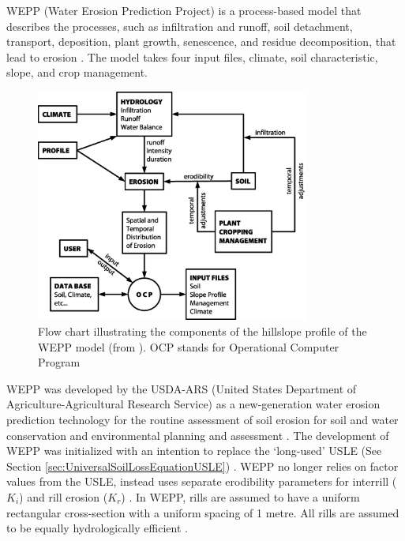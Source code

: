 WEPP (Water Erosion Prediction Project) is a process-based model that describes
the processes, such as infiltration and runoff, soil detachment, transport,
deposition, plant growth, senescence, and residue decomposition, that lead to
erosion \citep{flanagan1995-usda}. The model takes four input files, climate,
soil characteristic, slope, and crop management.

\begin{figure}[htbp]
  \centering
    \includegraphics[width=0.80\textwidth]{./img/wepp_flowchart}
  \caption[Flow chart of WEPP]{Flow chart illustrating the components of the
hillslope profile of the WEPP model (from
\citealp{lane1989-usda}). OCP stands for Operational Computer Program}
  \label{fig:wepp_flowchart}
\end{figure}

WEPP was developed by the USDA-ARS (United States Department of
Agriculture-Agricultural Research Service) as a new-generation water erosion
prediction technology for the routine assessment of soil erosion for soil and
water conservation and environmental planning and assessment
\citep{flanagan2007-1603}. The development of WEPP was initialized with an
intention to replace the `long-used' USLE (See Section
\ref{sec:UniversalSoilLossEquationUSLE}) \citep{nearing1989-1587,
flanagan1995-usda}. WEPP no longer relies on factor values from the USLE,
instead uses separate erodibility parameters for interrill ($K_i$) and rill
erosion ($K_r$) \citep{flanagan1995-usda}. In WEPP, rills are assumed to have a
uniform rectangular cross-section with a uniform spacing of 1 metre. All rills
are assumed to be equally hydrologically efficient \citep{flanagan1995-usda}.

